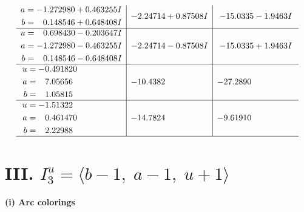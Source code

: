 \documentclass[1p]{elsarticle_modified}
\theoremstyle{definition}
\begin{document}
$$\begin{array}{c|c|c}
\begin{aligned}
a &= -1.272980 + 0.463255 I \\
b &= \phantom{-}0.148546 + 0.648408 I\end{aligned}
 & -2.24714 + 0.87508 I & -15.0335 - 1.9463 I \\ \hline\begin{aligned}
u &= \phantom{-}0.698430 - 0.203647 I \\
a &= -1.272980 - 0.463255 I \\
b &= \phantom{-}0.148546 - 0.648408 I\end{aligned}
 & -2.24714 - 0.87508 I & -15.0335 + 1.9463 I \\ \hline\begin{aligned}
u &= -0.491820\phantom{ +0.000000I} \\
a &= \phantom{-}7.05656\phantom{ +0.000000I} \\
b &= \phantom{-}1.05815\phantom{ +0.000000I}\end{aligned}
 & -10.4382\phantom{ +0.000000I} & -27.2890\phantom{ +0.000000I} \\ \hline\begin{aligned}
u &= -1.51322\phantom{ +0.000000I} \\
a &= \phantom{-}0.461470\phantom{ +0.000000I} \\
b &= \phantom{-}2.22988\phantom{ +0.000000I}\end{aligned}
 & -14.7824\phantom{ +0.000000I} & -9.61910\phantom{ +0.000000I}\\
 \hline 
 \end{array}$$\newpage\newpage\renewcommand{\arraystretch}{1}
\centering \section*{III. $I^u_{3}= \langle b-1,\;a-1,\;u+1 \rangle$}
\flushleft \textbf{(i) Arc colorings}\\
\end{document}
